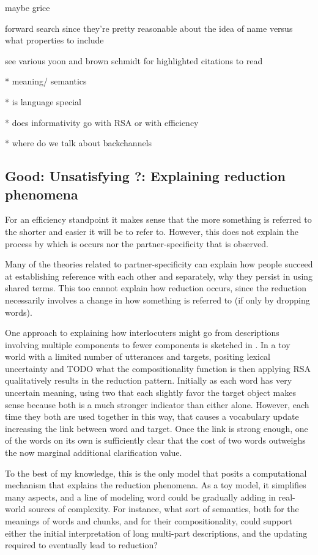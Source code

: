 \documentclass[]{article}
\begin{document}
maybe grice

forward search \cite{heller2012} since they're pretty reasonable about the idea of name versus what properties to include 


see various yoon and brown schmidt for highlighted citations to read 


* meaning/ semantics

* is language special 

* does informativity go with RSA or with efficiency 

* where do we talk about backchannels 


\subsection{Good: Unsatisfying ?: Explaining reduction phenomena}

For an efficiency standpoint it makes sense that the more something is referred to the shorter and easier it will be to refer to. However, this does not explain the process by which is occurs nor the partner-specificity that is observed. 

Many of the theories related to partner-specificity can explain how people succeed at establishing reference with each other and separately, why they persist in using shared terms. This too cannot explain how reduction occurs, since the reduction necessarily involves a change in how something is referred to (if only by dropping words). 

One approach to explaining how interlocuters might go from descriptions involving multiple components to fewer components is sketched in \cite{hawkins2021}. In a toy world with a limited number of utterances and targets, positing lexical uncertainty and TODO what the compositionality function is then applying RSA qualitatively results in the reduction pattern. Initially as each word has very uncertain meaning, using two that each slightly favor the target object makes sense because both is a much stronger indicator than either alone. However, each time they both are used together in this way, that causes a vocabulary update increasing the link between word and target. Once the link is strong enough, one of the words on its own is sufficiently clear that the cost of two words outweighs the now marginal additional clarification value. 

To the best of my knowledge, this is the only model that posits a computational mechanism that explains the reduction phenomena. As a toy model, it simplifies many aspects, and a line of modeling word could be gradually adding in real-world sources of complexity. For instance, what sort of semantics, both for the meanings of words and chunks, and for their compositionality, could support either the initial interpretation of long multi-part descriptions, and the updating required to eventually lead to reduction? 
\end{document}
